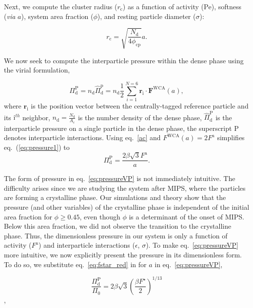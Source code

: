 \documentclass[twoside,twocolumn,9pt]{article}
\begin{document}
\noindent Next, we compute the cluster radius ($r_\text{c}$) as a function of activity ($\mathrm{Pe}$), softness (\textit{via} $a$), system area fraction ($\phi$), and resting particle diameter ($\sigma$):

\begin{equation}\label{rc}
    r_\text{c}=\sqrt{\frac{N_\text{d}}{4 \phi_\text{cp}}}a.
\end{equation}

We now seek to compute the interparticle pressure within the dense phase using the virial formulation,

\begin{equation}
    \Pi^\text{P}_\text{d}=n_\text{d} \hat{\Pi}^\text{p}_\text{d}=n_\text{d}\frac{1}{2}\sum^{N=6}_{i=1} \mathbf{r}_\text{i} \cdot \mathbf{F}^\text{WCA}(a),
    \label{eq:pressure1}
\end{equation}
where $\mathbf{r}_\text{i}$ is the position vector between the centrally-tagged reference particle and its $\text{i}^{th}$ neighbor, $n_\text{d}=\frac{N_\text{d}}{A_\text{c}}$ is the number density of the dense phase, $\hat{\Pi}^\text{P}_\text{d}$ is the interparticle pressure on a single particle in the dense phase, the superscript $\text{P}$ denotes interparticle interactions. 
Using eq.~\ref{ac} and $F^\text{WCA}(a)=2F^\text{a}$ simplifies eq.~(\ref{eq:pressure1}) to 
\begin{equation}
    \Pi^\text{P}_\text{d}=\frac{2\beta\sqrt{3}F^\text{a}}{a}. 
    \label{eq:pressureVP}
\end{equation}

\noindent The form of pressure in eq.~\ref{eq:pressureVP} is not immediately intuitive. The difficulty arises since we are studying the system after MIPS, where the particles are forming a crystalline phase. Our simulations and theory show that the pressure (and other variables) of the crystalline phase is independent of the initial area fraction for $\phi\ge0.45$, even though $\phi$ is a determinant of the onset of MIPS. Below this area fraction, we did not observe the transition to the crystalline phase. Thus, the dimensionless pressure in our system is only a function of activity ($F^\text{a}$) and interparticle interactions ($\epsilon$, $\sigma$). To make eq.~\ref{eq:pressureVP} more intuitive, we now explicitly present the pressure in its dimensionless form. To do so, we substitute eq.~\ref{eq:fstar_red} in for $a$ in eq.~\ref{eq:pressureVP},

\begin{equation}
    \frac{\Pi^\text{P}_\text{d}}{\Pi_0}=2\beta\sqrt{3} \left(\frac{\beta F^\star}{2}\right)^{1/13}
\end{equation},
\end{document}
